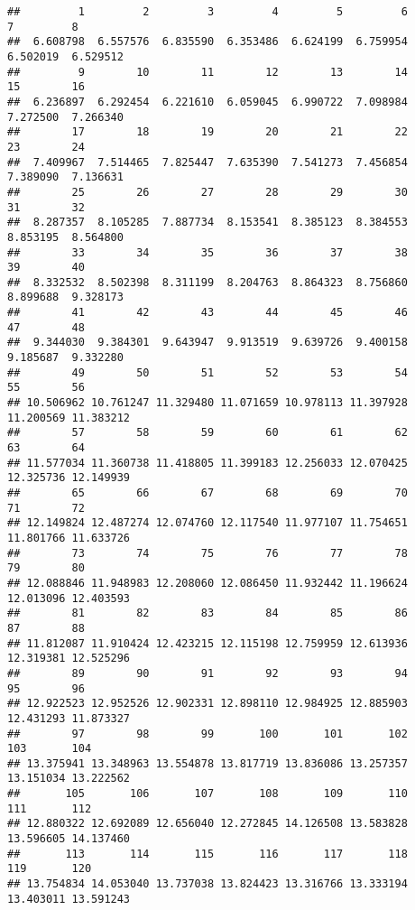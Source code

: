 \documentclass[
]{article}
\begin{document}
\begin{verbatim}
##         1         2         3         4         5         6         7         8 
##  6.608798  6.557576  6.835590  6.353486  6.624199  6.759954  6.502019  6.529512 
##         9        10        11        12        13        14        15        16 
##  6.236897  6.292454  6.221610  6.059045  6.990722  7.098984  7.272500  7.266340 
##        17        18        19        20        21        22        23        24 
##  7.409967  7.514465  7.825447  7.635390  7.541273  7.456854  7.389090  7.136631 
##        25        26        27        28        29        30        31        32 
##  8.287357  8.105285  7.887734  8.153541  8.385123  8.384553  8.853195  8.564800 
##        33        34        35        36        37        38        39        40 
##  8.332532  8.502398  8.311199  8.204763  8.864323  8.756860  8.899688  9.328173 
##        41        42        43        44        45        46        47        48 
##  9.344030  9.384301  9.643947  9.913519  9.639726  9.400158  9.185687  9.332280 
##        49        50        51        52        53        54        55        56 
## 10.506962 10.761247 11.329480 11.071659 10.978113 11.397928 11.200569 11.383212 
##        57        58        59        60        61        62        63        64 
## 11.577034 11.360738 11.418805 11.399183 12.256033 12.070425 12.325736 12.149939 
##        65        66        67        68        69        70        71        72 
## 12.149824 12.487274 12.074760 12.117540 11.977107 11.754651 11.801766 11.633726 
##        73        74        75        76        77        78        79        80 
## 12.088846 11.948983 12.208060 12.086450 11.932442 11.196624 12.013096 12.403593 
##        81        82        83        84        85        86        87        88 
## 11.812087 11.910424 12.423215 12.115198 12.759959 12.613936 12.319381 12.525296 
##        89        90        91        92        93        94        95        96 
## 12.922523 12.952526 12.902331 12.898110 12.984925 12.885903 12.431293 11.873327 
##        97        98        99       100       101       102       103       104 
## 13.375941 13.348963 13.554878 13.817719 13.836086 13.257357 13.151034 13.222562 
##       105       106       107       108       109       110       111       112 
## 12.880322 12.692089 12.656040 12.272845 14.126508 13.583828 13.596605 14.137460 
##       113       114       115       116       117       118       119       120 
## 13.754834 14.053040 13.737038 13.824423 13.316766 13.333194 13.403011 13.591243
\end{verbatim}
\end{document}
